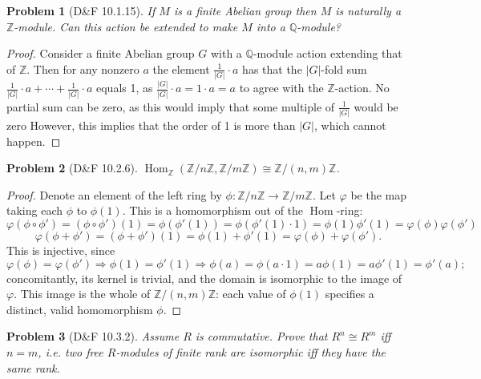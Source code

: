 \documentclass{article}
\newtheorem{plm}{Problem}
\DeclareMathOperator{\Hom}{Hom}
\begin{document}
\begin{plm}[D\&F 10.1.15]
  If $M$ is a finite Abelian group then $M$ is naturally a $\mathbb{Z}$-module.
  Can this action be extended to make $M$ into a $\mathbb{Q}$-module?
\end{plm}

\begin{proof}
  Consider a finite Abelian group $G$ with a $\mathbb{Q}$-module action extending that of $\mathbb{Z}$.
  Then for any nonzero $a$ the element $\frac{1}{|G|} \cdot a$ has that the $|G|$-fold sum $\frac{1}{|G|} \cdot a + \cdots + \frac{1}{|G|} \cdot a$
  equals 1, as $\frac{|G|}{|G|} \cdot a = 1 \cdot a = a$ to agree with the $\mathbb{Z}$-action.
  No partial sum can be zero, as this would imply that some multiple of $\frac{1}{|G|}$ would be zero
  However, this implies that the order of 1 is more than $|G|$, which cannot happen.
\end{proof}

\begin{plm}[D\&F 10.2.6]
  $\Hom_{\mathbb{Z}}(\mathbb{Z} / n\mathbb{Z}, \mathbb{Z} / m\mathbb{Z}) \cong \mathbb{Z} / (n, m)\mathbb{Z}$.
\end{plm}

\begin{proof}
  Denote an element of the left ring by $\phi: \mathbb{Z} / n\mathbb{Z} \to \mathbb{Z} / m\mathbb{Z}$.
  Let $\varphi$ be the map taking each $\phi$ to $\phi(1)$.
  This is a homomorphism out of the $\Hom$-ring:
  \[
    \varphi(\phi \circ \phi') = (\phi \circ \phi')(1) = \phi(\phi'(1)) = \phi(\phi'(1) \cdot 1) = \phi(1)\phi'(1) = \varphi(\phi)\varphi(\phi')
  \]
  \[
    \varphi(\phi + \phi') = (\phi + \phi')(1) = \phi(1) + \phi'(1) = \varphi(\phi) + \varphi(\phi').
  \]
  This is injective, since
  \[
    \varphi(\phi) = \varphi(\phi') \Rightarrow \phi(1) = \phi'(1) \Rightarrow \phi(a) = \phi(a \cdot 1) = a\phi(1) = a\phi'(1) = \phi'(a);
  \]
  concomitantly, its kernel is trivial, and the domain is isomorphic to the image of $\varphi$.
  This image is the whole of $\mathbb{Z} / (n, m)\mathbb{Z}$: each value of $\phi(1)$ specifies a distinct, valid homomorphism $\phi$.
\end{proof}

\begin{plm}[D\&F 10.3.2]
  Assume $R$ is commutative.
  Prove that $R^{n} \cong R^{m}$ iff $n = m$, i.e. two free $R$-modules of finite rank are isomorphic iff they have the same rank.
\end{plm}
\end{document}
